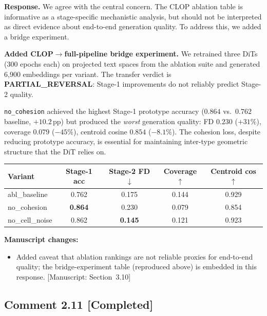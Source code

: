 \documentclass[11pt,letterpaper]{article}
\newcommand{\statuscompleted}{\textcolor{statusgreen}{\textbf{[Completed]}}}
\newcommand{\msref}[1]{\textcolor{blue!60!black}{\textsf{[Manuscript: #1]}}}
\begin{document}
\noindent\textbf{Response.}
We agree with the central concern. The CLOP ablation table is informative as a stage-specific mechanistic analysis, but should not be interpreted as direct evidence about end-to-end generation quality. To address this, we added a bridge experiment.

\begin{revisionupdate}
\textbf{Added CLOP$\to$full-pipeline bridge experiment.}
We retrained three DiTs (300 epochs each) on projected text spaces from the ablation suite and generated 6,900 embeddings per variant. The transfer verdict is \textbf{PARTIAL\_REVERSAL}: Stage-1 improvements do not reliably predict Stage-2 quality.

\texttt{no\_cohesion} achieved the highest Stage-1 prototype accuracy ($0.864$ vs.\ $0.762$ baseline, $+10.2$\,pp) but produced the \emph{worst} generation quality: FD $0.230$ ($+31\%$), coverage $0.079$ ($-45\%$), centroid cosine $0.854$ ($-8.1\%$). The cohesion loss, despite reducing prototype accuracy, is essential for maintaining inter-type geometric structure that the DiT relies on.

\medskip
\begin{tabular}{@{}lcccc@{}}
\toprule
\textbf{Variant} & \textbf{Stage-1 acc} & \textbf{Stage-2 FD}$\downarrow$ & \textbf{Coverage}$\uparrow$ & \textbf{Centroid cos}$\uparrow$ \\
\midrule
abl\_baseline & 0.762 & 0.175 & 0.144 & 0.929 \\
no\_cohesion & \textbf{0.864} & 0.230 & 0.079 & 0.854 \\
no\_cell\_noise & 0.862 & \textbf{0.145} & 0.121 & 0.923 \\
\bottomrule
\end{tabular}
\end{revisionupdate}

\noindent\textbf{Manuscript changes:}
\begin{itemize}
  \item Added caveat that ablation rankings are not reliable proxies for end-to-end quality; the bridge-experiment table (reproduced above) is embedded in this response. \msref{Section~3.10}
\end{itemize}

\medskip

\subsection*{Comment 2.11 \hfill \statuscompleted}
\end{document}
